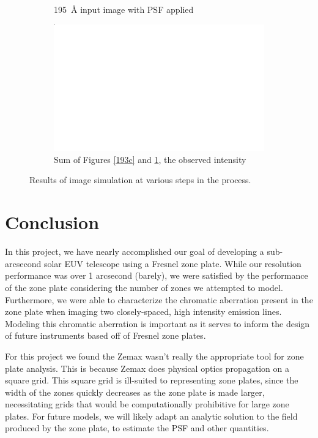 \documentclass[10pt,letterpaper]{article}
\begin{document}
\begin{figure}[h!]
\begin{subfigure}[t]{0.49\textwidth}
						\caption{\SI{195}{\angstrom} input image with PSF applied}
						\label{195c}
					\end{subfigure}
					\begin{subfigure}[t]{0.51\textwidth}
						\includegraphics[width=\textwidth]{psf/sum}	
						\caption{Sum of Figures \ref{193c} and \ref{195c}, the observed intensity}
						\label{sum}
					\end{subfigure}
					\caption{Results of image simulation at various steps in the process.}
					\label{img}
				\end{figure}
		
	\section{Conclusion}
	
		In this project, we have nearly accomplished our goal of developing a sub-arcsecond solar EUV telescope using a Fresnel zone plate. While our resolution performance was over 1 arcsecond (barely), we were satisfied by the performance of the zone plate considering the number of zones we attempted to model. Furthermore, we were able to characterize the chromatic aberration present in the zone plate when imaging two closely-spaced, high intensity emission lines. Modeling this chromatic aberration is important as it serves to inform the design of future instruments based off of Fresnel zone plates.
		
		For this project we found the Zemax wasn't really the appropriate tool for zone plate analysis. This is because Zemax does physical optics propagation on a square grid. This square grid is ill-suited to representing zone plates, since the width of the zones quickly decreases as the zone plate is made larger, necessitating grids that would be computationally prohibitive for large zone plates. For future models, we will likely adapt an analytic solution to the field produced by the zone plate, to estimate the PSF and other quantities.
	
\end{document}
